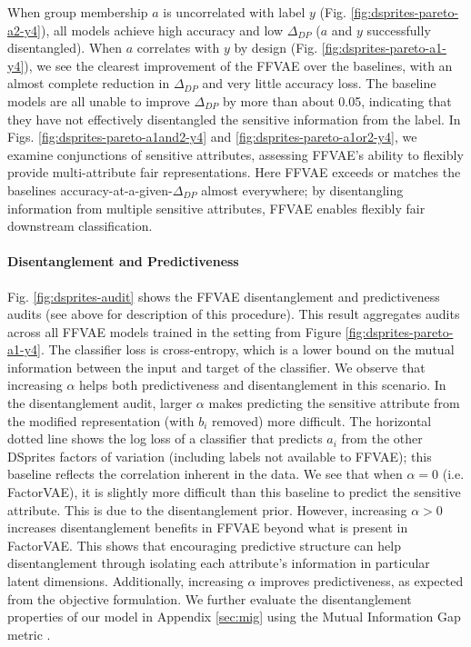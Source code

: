 When group membership $a$ is uncorrelated with label $y$ (Fig. \ref{fig:dsprites-pareto-a2-y4}), all models achieve high accuracy and low $\Delta_{DP}$ ($a$ and $y$ successfully disentangled).
When $a$ correlates with $y$ by design (Fig. \ref{fig:dsprites-pareto-a1-y4}), we see the clearest improvement of the FFVAE over the baselines, with an almost complete reduction in $\Delta_{DP}$ and very little accuracy loss.
The baseline models are all unable to improve $\Delta_{DP}$ by more than about 0.05, indicating that they have not effectively disentangled the sensitive information from the label.
In Figs. \ref{fig:dsprites-pareto-a1and2-y4} and \ref{fig:dsprites-pareto-a1or2-y4}, we examine conjunctions of sensitive attributes, assessing FFVAE's ability to flexibly provide multi-attribute fair representations.
Here FFVAE exceeds or matches the baselines accuracy-at-a-given-$\Delta_{DP}$ almost everywhere;
by disentangling information from multiple sensitive attributes, FFVAE enables flexibly fair downstream classification.

\paragraph{Disentanglement and Predictiveness}
Fig. \ref{fig:dsprites-audit} shows the FFVAE disentanglement and predictiveness audits (see above for description of this procedure).
This result aggregates audits across all FFVAE models trained in the setting from Figure \ref{fig:dsprites-pareto-a1-y4}.
The classifier loss is cross-entropy, which is a lower bound on the mutual information between the input and target of the classifier.
We observe that increasing $\alpha$ helps both predictiveness and disentanglement in this scenario.
In the disentanglement audit, larger $\alpha$ makes predicting the sensitive attribute from the modified representation (with $b_i$ removed) more difficult.
The horizontal dotted line shows the log loss of a classifier that predicts $a_i$ from the other DSprites factors of variation (including labels not available to FFVAE); this baseline reflects the correlation inherent in the data.
We see that when $\alpha = 0$ (i.e. FactorVAE), it is slightly more difficult than this baseline to predict the sensitive attribute.
This is due to the disentanglement prior.
However, increasing $\alpha > 0$ increases disentanglement benefits in FFVAE beyond what is present in FactorVAE.
This shows that encouraging predictive structure can help disentanglement through isolating each attribute's information in particular latent dimensions.
Additionally, increasing $\alpha$ improves predictiveness, as expected from the objective formulation.
We further evaluate the disentanglement properties of our model in Appendix \ref{sec:mig} using the Mutual Information Gap metric \cite{chen2018isolating}.

